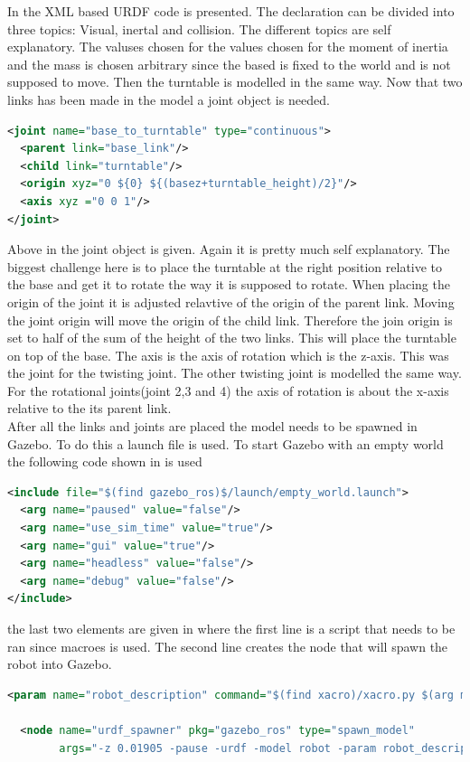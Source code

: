 In  the XML based URDF code is presented. The declaration can be divided into three topics: Visual, inertal and collision. The different topics are self explanatory. The valuses chosen for the values chosen for the moment of inertia and the mass is chosen arbitrary since the based is fixed to the world and is not supposed to move. Then the turntable is modelled in the same way. Now that two links has been made in the model a joint object is needed.

\begin{lstlisting}[language=xml,caption={joint between base and turntable},label={lst:jointBTT}]
<joint name="base_to_turntable" type="continuous">
  <parent link="base_link"/>
  <child link="turntable"/>
  <origin xyz="0 ${0} ${(basez+turntable_height)/2}"/>
  <axis xyz ="0 0 1"/>
</joint>
\end{lstlisting}
 Above in  the joint object is given. Again it is pretty much self explanatory. The biggest challenge here is to place the turntable at the right position relative to the base and get it to rotate the way it is supposed to rotate. When placing the origin of the joint it is adjusted relavtive of the origin of the parent link. Moving the joint origin will move the origin of the child link. Therefore the join origin is set to half of the sum of the height of the two links. This will place the turntable on top of the base. The axis is the axis of rotation which is the z-axis. This was the joint for the twisting joint. The other twisting joint is modelled the same way. For the rotational joints(joint 2,3 and 4) the axis of rotation is about the x-axis relative to the its parent link. \\
 
After all the links and joints are placed the model needs to be spawned in Gazebo. To do this a launch file is used. To start Gazebo with an empty world the following code shown in  is used
\begin{lstlisting}[language=xml,caption={Start Gazebo with empty world},label={lst:empty}]
<include file="$(find gazebo_ros)$/launch/empty_world.launch">
  <arg name="paused" value="false"/>
  <arg name="use_sim_time" value="true"/>
  <arg name="gui" value="true"/>
  <arg name="headless" value="false"/>
  <arg name="debug" value="false"/>
</include>
\end{lstlisting}
the last two elements are given in  where the first line is a script that needs to be ran since macroes is used. The second line creates the node that will spawn the robot into Gazebo. 
\begin{lstlisting}[caption={Spawn robot model in Gazebo},label={lst:l2},language=xml]
  <param name="robot_description" command="$(find xacro)/xacro.py $(arg model)" />

  <node name="urdf_spawner" pkg="gazebo_ros" type="spawn_model"
        args="-z 0.01905 -pause -urdf -model robot -param robot_description" respawn="false" output="screen" />
\end{lstlisting}

